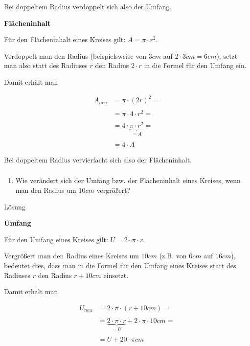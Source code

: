 \documentclass[
  ngerman,
]{book}
\providecommand{\tightlist}{%
  \setlength{\itemsep}{0pt}\setlength{\parskip}{0pt}}
\begin{document}
Bei doppeltem Radius verdoppelt sich also der Umfang.

\textbf{Flächeninhalt}

Für den Flächeninhalt eines Kreises gilt: \(A= \pi \cdot r^2\).

Verdoppelt man den Radius (beispielsweise von \(3cm\) auf \(2 \cdot 3cm =6cm\)), setzt man also statt des Radiuses \(r\) den Radius \(2 \cdot r\) in die Formel für den Umfang ein.

Damit erhält man

\[ \begin{align} A_{neu} &= \pi \cdot (2r)^2 =\\
                          {}\\
                         &= \pi \cdot 4\cdot r^2 =\\
                         {}\\
                         &= 4 \cdot \underbrace{\pi \cdot r^2}_{=A} =\\
                         {}\\
                         &= 4 \cdot A \end{align}\]

Bei doppeltem Radius vervierfacht sich also der Flächeninhalt.

\hypertarget{section-38}{%
\subsubsection*{}\label{section-38}}

\begin{enumerate}
\def\labelenumi{\alph{enumi})}
\setcounter{enumi}{1}
\tightlist
\item
  Wie verändert sich der Umfang bzw. der Flächeninhalt eines Kreises, wenn man den Radius um \(10cm\) vergrößert?
\end{enumerate}

Lösung

\textbf{Umfang}

Für den Umfang eines Kreises gilt: \(U = 2 \cdot \pi \cdot r\).

Vergrößert man den Radius eines Kreises um \(10cm\) (z.B. von \(6cm\) auf \(16cm\)), bedeutet dies, dass man in die Formel für den Umfang eines Kreises statt des Radiuses \(r\) den Radius \(r+10cm\) einsetzt.

Damit erhält man

\[ \begin{align} U_{neu} &= 2 \cdot \pi \cdot (r + 10cm) =\\
{}\\
                         &= \underbrace{2 \cdot \pi \cdot r}_{=U} + 2 \cdot \pi \cdot 10cm =\\
                         {}\\
                         &= U + 20\cdot\pi cm \end{align}\]
\end{document}
